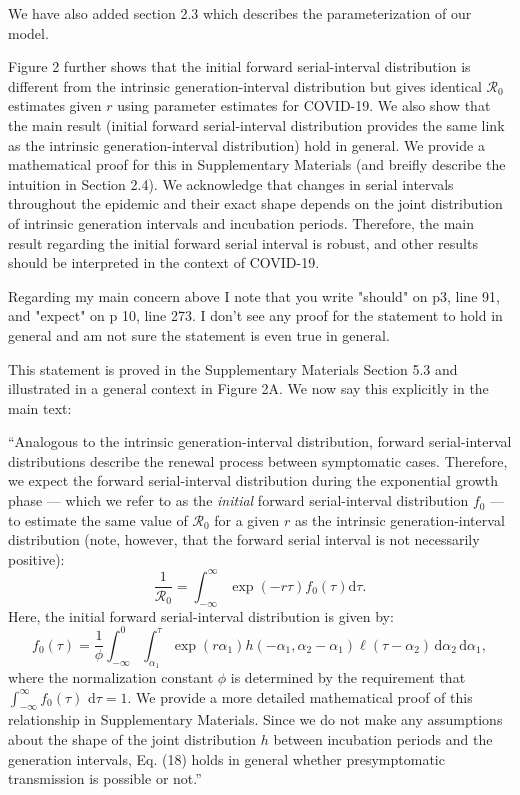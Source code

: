 \documentclass[12pt]{article}
\newcommand{\Ro}{\ensuremath{{\mathcal R}_{0}}\xspace}
\newcommand{\dd}[1]{\ensuremath{\, \mathrm{d}#1}}
\newcommand{\dtau}{\dd{\tau}}
\newcommand{\revtext}{\textsf}
\newcommand{\pinf}{\ensuremath{\alpha_1}} %
\newcommand{\sinf}{\ensuremath{\alpha_2}} %
\newcommand{\idist}{\ell} %
\begin{document}
We have also added section 2.3 which describes the parameterization of our model.

Figure 2 further shows that the initial forward serial-interval distribution is different from the intrinsic generation-interval distribution but gives identical \Ro estimates given $r$ using parameter estimates for COVID-19. 
We also show that the main result (initial forward serial-interval distribution provides the same link as the intrinsic generation-interval distribution) hold in general.
We provide a mathematical proof for this in Supplementary Materials (and breifly describe the intuition in Section 2.4). We acknowledge that changes in serial intervals throughout the epidemic and their exact shape depends on the joint distribution of intrinsic generation intervals and incubation periods.
Therefore, the main result regarding the initial forward serial interval is robust, and other results should be interpreted in the context of COVID-19.

\revtext{Regarding my main concern above I note that you write "should" on p3, line 91, and "expect" on p 10, line 273. I don't see any proof for the statement to hold in general and am not sure the statement is even true in general.}

This statement is proved in the Supplementary Materials Section 5.3 and illustrated in a general context in Figure 2A. We now say this explicitly in the main text:

``Analogous to the intrinsic generation-interval distribution, 
forward serial-interval distributions describe the renewal process between symptomatic cases.
Therefore, we expect the forward serial-interval distribution during the exponential growth phase --- which we refer to as the \emph{initial} forward serial-interval distribution $f_0$ --- to estimate the same value of \Ro for a given $r$ as the intrinsic generation-interval distribution (note, however, that the forward serial interval is not necessarily positive):
\begin{equation}
\frac{1}{\Ro} = \int_{-\infty}^\infty \exp(-r\tau) f_{0}(\tau) \mathrm{d} \tau.
\label{eq:Rforward}
\end{equation}
Here, the initial forward serial-interval distribution is given by:
\begin{equation}
f_{0}(\tau) = \frac{1}{\phi} \int_{-\infty}^{0} \int_{\pinf}^{\tau} \exp(r \pinf) h(-\pinf, \sinf - \pinf) \idist(\tau - \sinf) \, \mathrm{d}\sinf\,\mathrm{d}\pinf,
\label{eq:initialSI}
\end{equation}
where the normalization constant $\phi$ is determined by the requirement that $\int_{-\infty}^\infty f_{0}(\tau)\,\dtau=1$.
We provide a more detailed mathematical proof of this relationship in Supplementary Materials.
Since we do not make any assumptions about the shape of the joint distribution $h$ between incubation periods and the generation intervals, Eq. (18) holds in general whether presymptomatic transmission is possible or not.''
\end{document}
